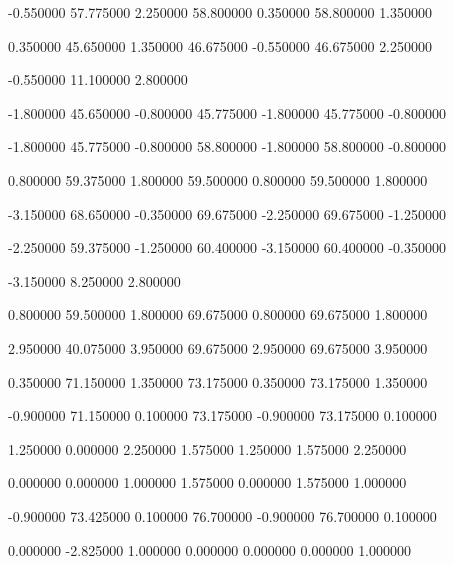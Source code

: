  {-0.550000} {57.775000} {2.250000} {58.800000} {0.350000} {58.800000} {1.350000}

 {0.350000} {45.650000} {1.350000} {46.675000} {-0.550000} {46.675000} {2.250000}

 {-0.550000} {11.100000} {2.800000}

 {-1.800000} {45.650000} {-0.800000} {45.775000} {-1.800000} {45.775000} {-0.800000}

 {-1.800000} {45.775000} {-0.800000} {58.800000} {-1.800000} {58.800000} {-0.800000}

 {0.800000} {59.375000} {1.800000} {59.500000} {0.800000} {59.500000} {1.800000}

 {-3.150000} {68.650000} {-0.350000} {69.675000} {-2.250000} {69.675000} {-1.250000}

 {-2.250000} {59.375000} {-1.250000} {60.400000} {-3.150000} {60.400000} {-0.350000}

 {-3.150000} {8.250000} {2.800000}

 {0.800000} {59.500000} {1.800000} {69.675000} {0.800000} {69.675000} {1.800000}

 {2.950000} {40.075000} {3.950000} {69.675000} {2.950000} {69.675000} {3.950000}

 {0.350000} {71.150000} {1.350000} {73.175000} {0.350000} {73.175000} {1.350000}

 {-0.900000} {71.150000} {0.100000} {73.175000} {-0.900000} {73.175000} {0.100000}

 {1.250000} {0.000000} {2.250000} {1.575000} {1.250000} {1.575000} {2.250000}

 {0.000000} {0.000000} {1.000000} {1.575000} {0.000000} {1.575000} {1.000000}

 {-0.900000} {73.425000} {0.100000} {76.700000} {-0.900000} {76.700000} {0.100000}

 {0.000000} {-2.825000} {1.000000} {0.000000} {0.000000} {0.000000} {1.000000}

